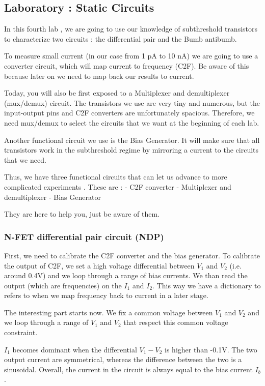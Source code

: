 \subsection{Laboratory : Static Circuits}

In this fourth lab , we are going to use our knowledge of subthreshold transistors to characterize two circuits : the differential pair and the Bumb antibumb.

To measure small current (in our case from 1 pA to 10 nA) we are going to use a converter circuit, which will map current to frequency (C2F). Be aware of this because later on we need to map back our results to current. 

Today, you will also be first exposed to a Multiplexer and demultiplexer (mux/demux) circuit. The transistors we use are very tiny and numerous, but the input-output pins and C2F converters are unfortunately spacious. Therefore, we need mux/demux to select the circuits that we want at the beginning of each lab. 

Another functional circuit we use is the Bias Generator. It will make sure that all transistors work in the subthreshold regime by mirroring a current to the circuits that we need. 

Thus, we have three functional circuits that can let us advance to more complicated experiments . These are : 
- C2F converter
- Multiplexer and demultiplexer
- Bias Generator 

They are here to help you, just be aware of them. 

\subsubsection{N-FET differential pair circuit (NDP)}
\label{lab:diffpair}
First, we need to calibrate the C2F converter and the bias generator. To calibrate the output of C2F, we set a high voltage differential between $V_1$ and $V_2$ (i.e. around 0.4V) and we loop through a range of bias currents. We than read the output (which are frequencies) on the $I_1$ and $I_2$. This way we have a dictionary to refers to when we map frequency back to current in a later stage. 

The interesting part starts now. We fix a common voltage between $V_1$ and $V_2$ and we loop through a range of $V_1$ and $V_2$ that respect this common voltage constraint. 

$I_1$ becomes dominant when the differential $V_1-V_2$ is higher than -0.1V. The two output current are symmetrical, whereas the difference between the two is a sinusoidal. Overall, the current in the circuit is always equal to the bias current $I_b$.

